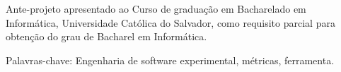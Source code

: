 \capa
\folhaderosto

\begin{resumo}
 Ante-projeto apresentado ao Curso de graduação em Bacharelado em Informática,
 Universidade Católica do Salvador, como requisito parcial para obtenção do grau
 de Bacharel em Informática.

 Palavras-chave: Engenharia de software experimental, métricas, ferramenta.
\end{resumo}

\sumario
